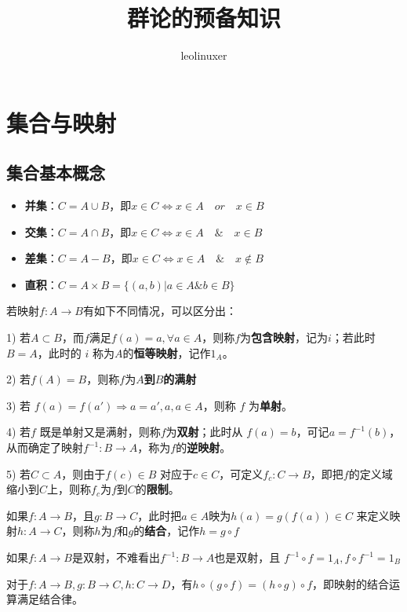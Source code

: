 \documentclass[12pt]{article}
\title{群论的预备知识\cite{From_Linear_Equation_To_Galois_Theory}}
\author{leolinuxer}
\begin{document}
\maketitle
\tableofcontents

\section{集合与映射}
\subsection{集合基本概念}
\begin{itemize}
\setlength{\itemsep}{0pt}
\setlength{\parsep}{0pt}
\setlength{\parskip}{0pt}
    \item \textbf{并集}：$C = A\cup B$，即$x\in C \Leftrightarrow x\in A \quad or \quad x \in B$
    \item \textbf{交集}：$C = A \cap B$，即$x\in C \Leftrightarrow x\in A \quad \& \quad x \in B$
    \item \textbf{差集}：$C = A - B$，即$x\in C \Leftrightarrow x\in A \quad \& \quad x \notin B$
    \item \textbf{直积}：$C = A \times B = \{(a,b)|a\in A \& b \in B\}$
\end{itemize}

若映射$f: A \rightarrow B$有如下不同情况，可以区分出：

1) 若$A \subset B$，而$f$满足$f(a) = a, \forall a \in A$，则称$f$为\textbf{包含映射}，记为$i$；若此时 $B=A$，此时的 $i$ 称为$A$的\textbf{恒等映射}，记作$1_A$。

2) 若$f(A) = B$，则称$f$为\textbf{$A$到$B$的满射}

3) 若 $f(a) = f(a') \Rightarrow a = a', a,a \in A$，则称 $f$ 为\textbf{单射}。

4) 若$f$ 既是单射又是满射，则称$f$为\textbf{双射}；此时从 $f(a) = b$，可记$a = f^{-1}(b)$，从而确定了映射$f^{-1}: B \rightarrow A$，称为$f$的\textbf{逆映射}。

5) 若$C \subset A$，则由于$f(c) \in B$ 对应于$c \in C$，可定义$f_c: C \rightarrow B$，即把$f$的定义域缩小到$C$上，则称$f_c$为$f$到$C$的\textbf{限制}。

\begin{framed}
如果$f: A \rightarrow B$，且$g: B \rightarrow C$，此时把$a \in A$映为$h(a) = g(f(a)) \in C$ 来定义映射$h: A \rightarrow C$，则称$h$为$f$和$g$的\textbf{结合}，记作$h = g\circ f$

如果$f: A \rightarrow B$是双射，不难看出$f^{-1}: B \rightarrow A$也是双射，且 $f^{-1}\circ f = 1_A, f\circ f^{-1} = 1_B$

对于$f: A \rightarrow B, g: B \rightarrow C, h: C \rightarrow D$，有$h\circ (g\circ f) = (h\circ g)\circ f$，即映射的结合运算满足结合律。
\end{framed}
\end{document}
